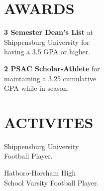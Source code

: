 \documentclass{article}
\newenvironment{ntext} {
    \small
    \color{Dark-Grey}
    \setlength{\parskip}{0.75em}
    \renewcommand{\familydefault}{merriweather}
} {\par}
\begin{document}
\begin{multicols}{2}
\section*{AWARDS}
    \begin{ntext}

        \textbf{3 Semester Dean's List} at \\
        Shippensburg University for \\
        having a 3.5 GPA or higher.

        \textbf{2 PSAC Scholar-Athlete} for \\
        maintaining a 3.25 cumulative \\
        GPA while in season.

    \end{ntext}
\section*{ACTIVITES}
    \begin{ntext}

        Shippensburg University \\
        Football Player.

        Hatboro-Horsham High \\
        School Varsity Football Player.
    \end{ntext}

\end{multicols}
\end{document}
